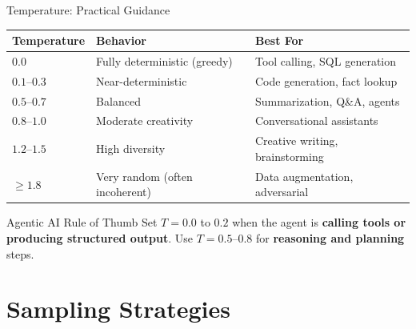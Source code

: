 \documentclass{beamer}
\begin{document}
\begin{frame}{Temperature: Practical Guidance}
    \begin{table}
        \centering
        \small
        \begin{tabular}{@{}lll@{}}
            \toprule
            \textbf{Temperature} & \textbf{Behavior} & \textbf{Best For} \\ \midrule
            $0.0$        & Fully deterministic (greedy)   & Tool calling, SQL generation       \\
            $0.1$--$0.3$ & Near-deterministic             & Code generation, fact lookup       \\
            $0.5$--$0.7$ & Balanced                       & Summarization, Q\&A, agents        \\
            $0.8$--$1.0$ & Moderate creativity            & Conversational assistants          \\
            $1.2$--$1.5$ & High diversity                 & Creative writing, brainstorming    \\
            $\geq 1.8$   & Very random (often incoherent) & Data augmentation, adversarial     \\ \bottomrule
        \end{tabular}
    \end{table}

    \vspace{0.2cm}
    \begin{alertblock}{Agentic AI Rule of Thumb}
        Set $T = 0.0$ to $0.2$ when the agent is \textbf{calling tools or producing structured output}.
        Use $T = 0.5$--$0.8$ for \textbf{reasoning and planning} steps.
    \end{alertblock}
\end{frame}

\section{Sampling Strategies}
\end{document}
